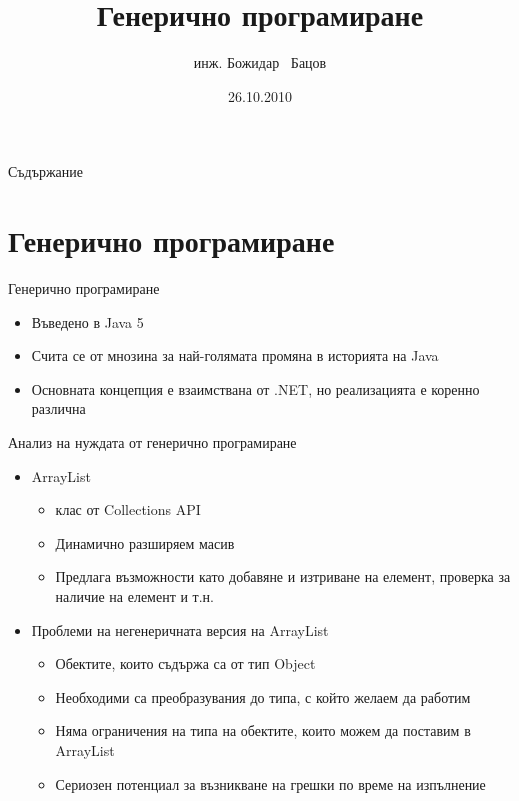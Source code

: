 \documentclass{beamer}
\title{Генерично програмиране}
\author{инж. Божидар ~Бацов}
\institute{Drow Ltd.}
\date{26.10.2010}
\begin{document}
\begin{frame}
  \titlepage
\end{frame}

\begin{frame}{Съдържание}
  \tableofcontents
\end{frame}




\section{Генерично програмиране}

\begin{frame}{Генерично програмиране}
  \begin{itemize}
  \item Въведено в Java 5
  \item Счита се от мнозина за най-голямата промяна в историята на
    Java
  \item Основната концепция е взаимствана от .NET, но реализацията е
    коренно различна
  \end{itemize}
\end{frame}

\begin{frame}{Анализ на нуждата от генерично програмиране}
  \transdissolve
  \begin{itemize}
  \item ArrayList
    \begin{itemize}
      \item клас от Collections API
      \item Динамично разширяем масив
      \item Предлага възможности като добавяне и изтриване на елемент,
        проверка за наличие на елемент и т.н.
    \end{itemize}
  \item Проблеми на негенеричната версия на ArrayList
    \begin{itemize}
      \item Обектите, които съдържа са от тип Object
      \item Необходими са преобразувания до типа, с който желаем да
        работим
      \item Няма ограничения на типа на обектите, които можем да
        поставим в ArrayList
      \item Сериозен потенциал за възникване на грешки по време на изпълнение
    \end{itemize}

  \end{itemize}
\end{frame}
\end{document}
